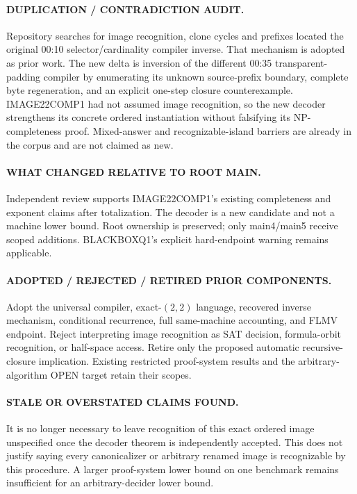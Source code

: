 \documentclass[11pt]{article}
\begin{document}
\paragraph{DUPLICATION / CONTRADICTION AUDIT.}
Repository searches for image recognition, clone cycles and prefixes located
the original 00:10 selector/cardinality compiler inverse. That mechanism is
adopted as prior work. The new delta is inversion of the different 00:35
transparent-padding compiler by enumerating its unknown source-prefix
boundary, complete byte regeneration, and an explicit one-step closure
counterexample. IMAGE22COMP1 had not assumed image recognition, so the new
decoder strengthens its concrete ordered instantiation without falsifying
its NP-completeness proof. Mixed-answer and recognizable-island barriers are
already in the corpus and are not claimed as new.

\paragraph{WHAT CHANGED RELATIVE TO ROOT MAIN.}
Independent review supports IMAGE22COMP1's existing completeness and exponent
claims after totalization. The decoder is a new candidate and not a machine
lower bound. Root ownership is preserved; only main4/main5 receive scoped
additions. BLACKBOXQ1's explicit hard-endpoint warning remains applicable.

\paragraph{ADOPTED / REJECTED / RETIRED PRIOR COMPONENTS.}
Adopt the universal compiler, exact-$(2,2)$ language, recovered inverse
mechanism, conditional recurrence, full same-machine accounting, and FLMV
endpoint. Reject interpreting image recognition as SAT decision, formula-orbit
recognition, or half-space access. Retire only the proposed automatic
recursive-closure implication. Existing restricted proof-system results and
the arbitrary-algorithm OPEN target retain their scopes.

\paragraph{STALE OR OVERSTATED CLAIMS FOUND.}
It is no longer necessary to leave recognition of this exact ordered image
unspecified once the decoder theorem is independently accepted. This does not
justify saying every canonicalizer or arbitrary renamed image is recognizable
by this procedure. A larger proof-system lower bound on one benchmark remains
insufficient for an arbitrary-decider lower bound.
\end{document}
